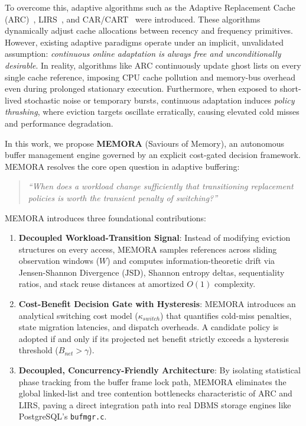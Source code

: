 \documentclass[conference]{IEEEtran}
\begin{document}
To overcome this, adaptive algorithms such as the Adaptive Replacement Cache (ARC)~\cite{megiddo2003arc}, LIRS~\cite{jiang2002lirs}, and CAR/CART~\cite{bansal2004car} were introduced. These algorithms dynamically adjust cache allocations between recency and frequency primitives. However, existing adaptive paradigms operate under an implicit, unvalidated assumption: \textit{continuous online adaptation is always free and unconditionally desirable}. In reality, algorithms like ARC continuously update ghost lists on every single cache reference, imposing CPU cache pollution and memory-bus overhead even during prolonged stationary execution. Furthermore, when exposed to short-lived stochastic noise or temporary bursts, continuous adaptation induces \textit{policy thrashing}, where eviction targets oscillate erratically, causing elevated cold misses and performance degradation.

In this work, we propose \textbf{MEMORA} (Saviours of Memory), an autonomous buffer management engine governed by an explicit cost-gated decision framework. MEMORA resolves the core open question in adaptive buffering:
\begin{quote}
\textit{``When does a workload change sufficiently that transitioning replacement policies is worth the transient penalty of switching?''}
\end{quote}

MEMORA introduces three foundational contributions:
\begin{enumerate}
    \item \textbf{Decoupled Workload-Transition Signal}: Instead of modifying eviction structures on every access, MEMORA samples references across sliding observation windows ($W$) and computes information-theoretic drift via Jensen-Shannon Divergence ($\text{JSD}$), Shannon entropy deltas, sequentiality ratios, and stack reuse distances at amortized $O(1)$ complexity.
    \item \textbf{Cost-Benefit Decision Gate with Hysteresis}: MEMORA introduces an analytical switching cost model ($\kappa_{switch}$) that quantifies cold-miss penalties, state migration latencies, and dispatch overheads. A candidate policy is adopted if and only if its projected net benefit strictly exceeds a hysteresis threshold ($B_{net} > \gamma$).
    \item \textbf{Decoupled, Concurrency-Friendly Architecture}: By isolating statistical phase tracking from the buffer frame lock path, MEMORA eliminates the global linked-list and tree contention bottlenecks characteristic of ARC and LIRS, paving a direct integration path into real DBMS storage engines like PostgreSQL's \texttt{bufmgr.c}.
\end{enumerate}
\end{document}
